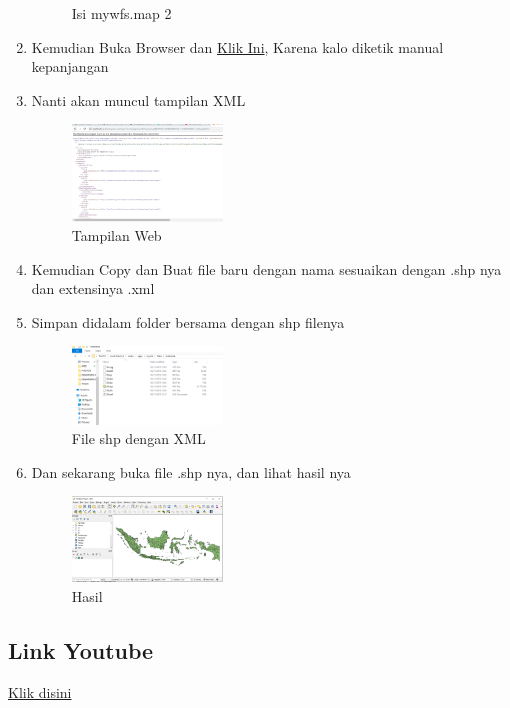 \begin{enumerate}
\begin{figure}[H]
		\centering
		\caption{Isi mywfs.map 2}
    \end{figure}
  \item Kemudian Buka Browser dan \href{http://localhost:8080/cgi-bin/mapserv.exe?map=/ms4w/apps/mywfs/mywfs.map&SERVICE=WFS&VERSION=1.0.0&REQUEST=GetCapabilities}{Klik Ini}, Karena kalo diketik manual kepanjangan
  \item Nanti akan muncul tampilan XML
  \hfill\break
    \begin{figure}[H]
		\includegraphics[width=4cm]{figures/1174004/4/10.PNG}
		\centering
		\caption{Tampilan Web}
    \end{figure}
  \item Kemudian Copy dan Buat file baru dengan nama sesuaikan dengan .shp nya dan extensinya .xml
  \item Simpan didalam folder bersama dengan shp filenya
  \hfill\break
  \begin{figure}[H]
  \includegraphics[width=4cm]{figures/1174004/4/11.PNG}
  \centering
  \caption{File shp dengan XML}
  \end{figure}
  \item Dan sekarang buka file .shp nya, dan lihat hasil nya
  \hfill\break
  \begin{figure}[H]
  \includegraphics[width=4cm]{figures/1174004/4/12.PNG}
  \centering
  \caption{Hasil}
  \end{figure}
\end{enumerate}
\subsection{Link Youtube}
\href{}{Klik disini}